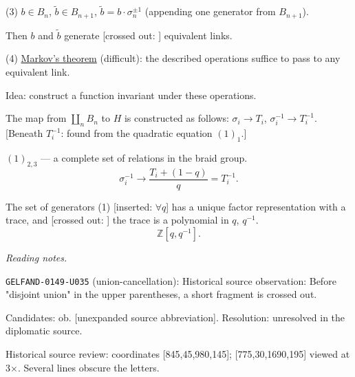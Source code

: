 (3) $b\in B_n$, $\widetilde b\in B_{n+1}$,
$\widetilde b=b\cdot\sigma_n^{\pm1}$
(appending one generator from $B_{n+1}$).

Then $b$ and $\widetilde b$ generate
[crossed out: ]
equivalent links.


(4) \underline{Markov's theorem} (difficult): the described operations suffice
to pass to any equivalent link.

Idea: construct a function invariant under these operations.

The map from $\coprod_n B_n$ to $H$ is constructed as follows:
$\sigma_i\to T_i$, $\sigma_i^{-1}\to T_i^{-1}$.
[Beneath $T_i^{-1}$: found from the quadratic equation $(1)_1$.]

$(1)_{2,3}$ --- a complete set of relations in the braid group.
\begin{equation*}
\sigma_i^{-1}\longrightarrow\frac{T_i+(1-q)}{q}=T_i^{-1}.
\end{equation*}

The set of generators (1) [inserted: $\forall q$] has a unique factor representation
with a trace, and
[crossed out: ]
the trace is a polynomial in $q$, $q^{-1}$.
\begin{equation*}
\mathbb Z[q,q^{-1}].
\end{equation*}


\par\smallskip\noindent\textit{Reading notes.}\par
\noindent\texttt{GELFAND-0149-U035} (union-cancellation): Historical source observation: Before "disjoint union" in the upper parentheses, a short fragment is crossed out.\par
Candidates: ob. [unexpanded source abbreviation]. Resolution: unresolved in the diplomatic source.\par
Historical source review: coordinates [845,45,980,145]; [775,30,1690,195] viewed at 3×. Several lines obscure the letters.\par

